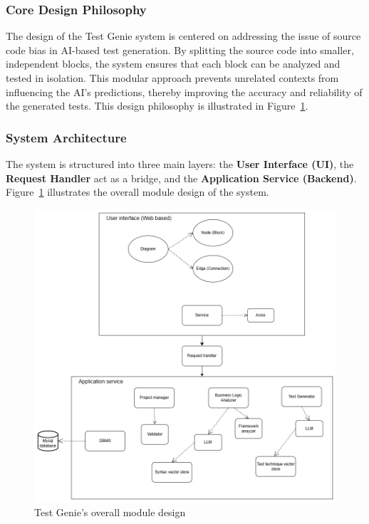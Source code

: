 \subsubsection{Core Design Philosophy}

\hspace{0.5cm}The design of the Test Genie system is centered on addressing the issue of source code bias in AI-based test generation. By splitting the source code into smaller, independent blocks, the system ensures that each block can be analyzed and tested in isolation. This modular approach prevents unrelated contexts from influencing the AI's predictions, thereby improving the accuracy and reliability of the generated tests. This design philosophy is illustrated in Figure~\ref{fig:system-design}.

\subsubsection{System Architecture}
The system is structured into three main layers: the \textbf{User Interface (UI)}, the \textbf{Request Handler} act as a bridge, and the \textbf{Application Service (Backend)}. Figure~\ref{fig:system-design} illustrates the overall module design of the system.
\begin{figure}[H]
	\centering
	\includegraphics[width=1.0\textwidth]{images/System design.drawio.png}
	\caption{Test Genie’s overall module design}
	\label{fig:system-design}
\end{figure}

